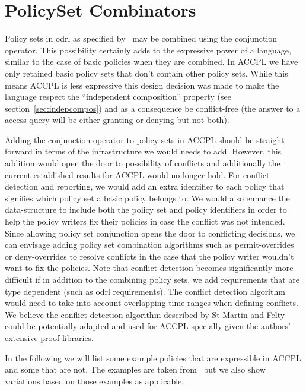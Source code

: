 \section{PolicySet Combinators}\label{sec:policysetcombo}

Policy sets in \ac{odrl} as specified by~\cite{pucella2006} may be combined using the conjunction operator. This possibility certainly adds to the expressive power of a language, similar to the case of basic policies when they are combined. In \ac{ACCPL} we have only retained basic policy sets that don't contain other policy sets. While this means \ac{ACCPL} is less expressive this design decision was made to make the language respect the ``independent composition'' property (see section~\ref{sec:indepcompos}) and as a consequence be conflict-free (the answer to a access query will be either granting or denying but not both). 

Adding the conjunction operator to policy sets in \ac{ACCPL} should be straight forward in terms of the infrastructure we would needs to add. However, this addition would open the door to possibility of conflicts and additionally the current established results for \ac{ACCPL} would no longer hold. For conflict detection and reporting, we would add an extra identifier to each policy that signifies which policy set a basic policy belongs to. We would also enhance the  data-structure to include both the policy set and policy identifiers in order to help the policy writers fix their policies in case the conflict was not intended. Since allowing policy set conjunction opens the door to conflicting decisions, we can envisage adding policy set combination algorithms such as permit-overrides or deny-overrides to resolve conflicts in the case that the policy writer wouldn't want to fix the policies. Note that conflict detection becomes significantly more difficult if in addition to the combining policy sets, we add requirements that are type dependent (such as \ac{odrl} requirements). The conflict detection algorithm would need to take into account overlapping time ranges when defining conflicts. We believe the conflict detection algorithm described by St-Martin and Felty~\cite{felty16} could be potentially adapted and used for \ac{ACCPL} specially given the authors' extensive proof libraries. 

In the following we will list some example policies that are expressible in \ac{ACCPL} and some that are not. The examples are taken from~\cite{pucella2006} but we also show variations based on those examples as applicable.

